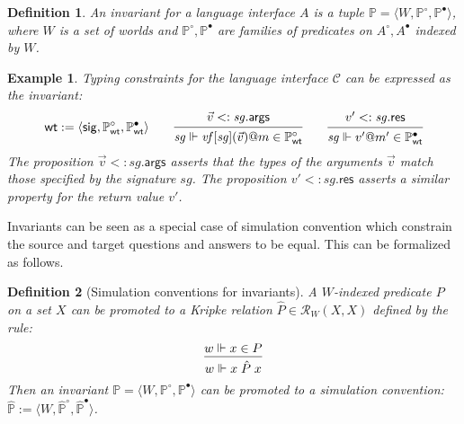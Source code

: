 \documentclass[draft,11pt]{report}
\newtheorem{definition}{Definition}
\newtheorem{example}{Example}
\newcommand{\kw}[1]{\ensuremath{ \mathsf{#1} }}
\newcommand{\que}{\circ}         %
\newcommand{\ans}{\bullet}       %
\begin{document}
\begin{definition} %
An \emph{invariant for a language interface} $A$
is a tuple
$\mathbb{P} = \langle W, \mathbb{P}^\que, \mathbb{P}^\ans \rangle$,
where $W$ is a set of worlds
and $\mathbb{P}^\que, \mathbb{P}^\ans$
are families of predicates on $A^\que, A^\ans$
indexed by $W$.
\end{definition}

\begin{example} \label{ex:wt} %
Typing constraints for the language interface $\mathcal{C}$
can be expressed as the invariant:
\[
  \kw{wt} :=
    \langle
      \kw{sig},
      \mathbb{P}_\kw{wt}^\que,
      \mathbb{P}_\kw{wt}^\ans
    \rangle
  \qquad
  \begin{prooftree}
    \hypo{\vec{v} <: \mathit{sg}.\kw{args}}
    \infer1{\mathit{sg} \Vdash
      \mathit{vf}[\mathit{sg}](\vec{v})@m \in \mathbb{P}_\kw{wt}^\que}
  \end{prooftree}
  \qquad
  \begin{prooftree}
    \hypo{v' <: \mathit{sg}.\kw{res}}
    \infer1{\mathit{sg} \Vdash
      v'@m' \in \mathbb{P}_\kw{wt}^\ans}
  \end{prooftree}
\]
The proposition $\vec{v} <: \mathit{sg}.\kw{args}$
asserts that the types of the arguments $\vec{v}$
match those specified by the signature $\mathit{sg}$.
The proposition $v' <: \mathit{sg}.\kw{res}$
asserts a similar property for the return value $v'$.
\end{example}

Invariants can be seen as a special case of simulation convention
which constrain the source and target questions and answers
to be equal.
This can be formalized as follows.

\begin{definition}[Simulation conventions for invariants]
A $W$-indexed predicate $P$ on a set $X$
can be promoted to a Kripke relation
$\hat{P} \in \mathcal{R}_W(X, X)$
defined by the rule:
\[
  \begin{prooftree}
    \hypo{w \Vdash x \in P}
    \infer1{w \Vdash x \mathrel{\hat{P}} x}
  \end{prooftree}
\]
Then an invariant
$\mathbb{P} = \langle W, \mathbb{P}^\que, \mathbb{P}^\ans \rangle$
can be promoted to a simulation convention:
$\hat{\mathbb{P}} :=
 \langle W, \hat{\mathbb{P}}^\que, \hat{\mathbb{P}}^\ans \rangle$.
\end{definition}

\end{document}
